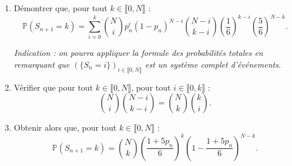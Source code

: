 \documentclass{article}
\begin{document}
\begin{enumerate}
    \begin{enumerate}
        \item Démontrer que, pour tout $k \in \llbracket 0,N \rrbracket$ :
        \[
            \mathbb{P}(S_{n+1} = k)
            =
            \sum_{i=0}^{k}
            \binom{N}{i}
            p_n^i (1-p_n)^{N-i}
            \binom{N-i}{k-i}
            \left(\frac{1}{6}\right)^{k-i}
            \left(\frac{5}{6}\right)^{N-k}.
        \]
        
        \textit{Indication : on pourra appliquer la formule des probabilités totales en remarquant que $(\{S_n = i\})_{i \in \llbracket 0,N \rrbracket}$ est un système complet d'événements.}
        
        \item Vérifier que pour tout $k \in \llbracket 0,N \rrbracket$, pour tout $i \in \llbracket 0,k \rrbracket$ :
        \[
            \binom{N}{i} \binom{N-i}{k-i}
            =
            \binom{N}{k} \binom{k}{i}.
        \]
        \item Obtenir alors que, pour tout $k \in \llbracket 0,N \rrbracket$ :
        \[
            \mathbb{P}(S_{n+1} = k)
            =
            \binom{N}{k}
            \left(\frac{1+5p_n}{6}\right)^k
            \left(1 - \frac{1+5p_n}{6}\right)^{N-k}.
            \]
    \end{enumerate}
\end{enumerate}
\end{document}
